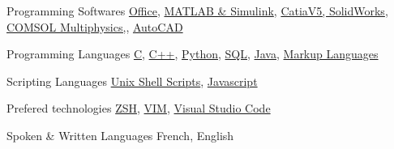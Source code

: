 

\begin{cvskills}

  \cvskill
    {Programming Softwares} %
    {\href{https://www.office.com/}{Office},
     \href{https://www.mathworks.com/}{MATLAB \& Simulink},
     \href{https://www.3ds.com/products-services/}{CatiaV5, SolidWorks},
     \href{https://www.comsol.com/}{COMSOL Multiphysics,},
     \href{https://www.autodesk.ca/en/products/autocad/overview}{AutoCAD}
    } %

  \cvskill
    {Programming Languages} %
    {\href{https://en.cppreference.com/w/c/languagehttps://en.cppreference.com/w/c/language}{C},
     \href{https://en.cppreference.com/w/cpp/language}{C++},
     \href{https://www.python.org/}{Python},
     \href{https://docs.oracle.com/en/database/other-databases/index.html}{SQL},
     \href{https://docs.oracle.com/en/java/index.html}{Java},
     \href{https://techterms.com/definition/markup_language}{Markup Languages}
    } %

  \cvskill
    {Scripting Languages} %
    {\href{https://www.gnu.org/software/bash/}{Unix Shell Scripts},
     \href{https://developer.oracle.com/ca-en/javascript/}{Javascript}
    }

  \cvskill
    {Prefered technologies} %
    {\href{http://zsh.sourceforge.net/}{ZSH},
     \href{https://www.vim.org/}{VIM},
     \href{https://code.visualstudio.com/}{Visual Studio Code}
    } %

  \cvskill
  {Spoken \& Written Languages} %
    {French, English} %

\end{cvskills}

